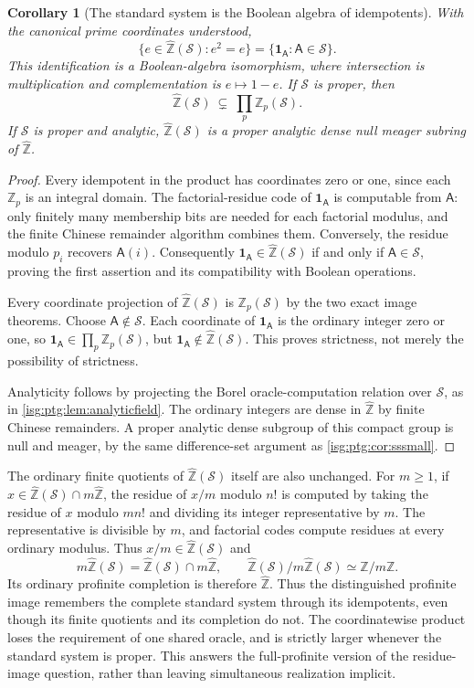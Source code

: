 \documentclass[11pt]{article}
\newtheorem{corollary}[corollary]{Corollary}
\theoremstyle{definition}
\theoremstyle{remark}
\newcommand{\Z}{\mathbb{Z}}
\newcommand{\Zhat}{\widehat{\Z}}
\newcommand{\Zp}{\mathbb{Z}_p}
\begin{document}
\begin{corollary}[The standard system is the Boolean algebra of idempotents]\label{isg:ptg:cor:idempotents}
With the canonical prime coordinates understood,
\[
 \{e\in\Zhat(\mathcal S):e^2=e\}=\{\mathbf 1_{\mathsf A}:\mathsf A\in\mathcal S\}.
\]
This identification is a Boolean-algebra isomorphism, where intersection is
multiplication and complementation is $e\mapsto1-e$. If $\mathcal S$ is
proper, then
\[
 \Zhat(\mathcal S)\ \subsetneq\ \prod_p \Zp(\mathcal S).
\]
If $\mathcal S$ is proper and analytic, $\Zhat(\mathcal S)$ is a proper
analytic dense null meager subring of $\Zhat$.
\end{corollary}
\begin{proof}
Every idempotent in the product has coordinates zero or one, since each
$\Zp$ is an integral domain. The factorial-residue code of
$\mathbf 1_{\mathsf A}$ is computable from $\mathsf A$: only finitely many
membership bits are needed for each factorial modulus, and the finite
Chinese remainder algorithm combines them. Conversely, the residue modulo
$p_i$ recovers $\mathsf A(i)$. Consequently
$\mathbf 1_{\mathsf A}\in\Zhat(\mathcal S)$ if and only if
$\mathsf A\in\mathcal S$, proving the first assertion and its compatibility
with Boolean operations.

Every coordinate projection of $\Zhat(\mathcal S)$ is $\Zp(\mathcal S)$ by
the two exact image theorems. Choose $\mathsf A\notin\mathcal S$. Each
coordinate of $\mathbf 1_{\mathsf A}$ is the ordinary integer zero or one,
so $\mathbf 1_{\mathsf A}\in\prod_p\Zp(\mathcal S)$, but
$\mathbf 1_{\mathsf A}\notin\Zhat(\mathcal S)$. This proves strictness, not
merely the possibility of strictness.

Analyticity follows by projecting the Borel oracle-computation relation
over $\mathcal S$, as in \cref{isg:ptg:lem:analyticfield}. The ordinary
integers are dense in $\Zhat$ by finite Chinese remainders. A proper
analytic dense subgroup of this compact group is null and meager, by the
same difference-set argument as \cref{isg:ptg:cor:sssmall}.
\end{proof}

The ordinary finite quotients of $\Zhat(\mathcal S)$ itself are also
unchanged. For $m\geq1$, if $x\in\Zhat(\mathcal S)\cap m\Zhat$, the residue
of $x/m$ modulo $n!$ is computed by taking the residue of $x$ modulo $mn!$
and dividing its integer representative by $m$. The representative is
divisible by $m$, and factorial codes compute residues at every ordinary
modulus. Thus $x/m\in\Zhat(\mathcal S)$ and
\[
 m\Zhat(\mathcal S)=\Zhat(\mathcal S)\cap m\Zhat,\qquad
 \Zhat(\mathcal S)/m\Zhat(\mathcal S)\simeq\Z/m\Z.
\]
Its ordinary profinite completion is therefore $\Zhat$. Thus the
distinguished profinite image remembers the complete standard system
through its idempotents, even though its finite quotients and its
completion do not. The coordinatewise product loses the requirement of one
shared oracle, and is strictly larger whenever the standard system is
proper. This answers the full-profinite version of the residue-image
question, rather than leaving simultaneous realization implicit.
\end{document}
